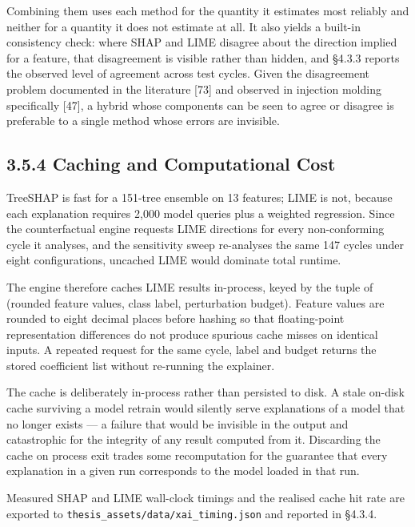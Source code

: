 Combining them uses each method for the quantity it estimates most reliably and neither for a quantity it does not estimate at all. It also yields a built-in consistency check: where SHAP and LIME disagree about the direction implied for a feature, that disagreement is visible rather than hidden, and §4.3.3 reports the observed level of agreement across test cycles. Given the disagreement problem documented in the literature {[}73{]} and observed in injection molding specifically {[}47{]}, a hybrid whose components can be seen to agree or disagree is preferable to a single method whose errors are invisible.

\hypertarget{caching-and-computational-cost}{%
\subsection{3.5.4 Caching and Computational Cost}\label{caching-and-computational-cost}}

TreeSHAP is fast for a 151-tree ensemble on 13 features; LIME is not, because each explanation requires 2,000 model queries plus a weighted regression. Since the counterfactual engine requests LIME directions for every non-conforming cycle it analyses, and the sensitivity sweep re-analyses the same 147 cycles under eight configurations, uncached LIME would dominate total runtime.

The engine therefore caches LIME results in-process, keyed by the tuple of (rounded feature values, class label, perturbation budget). Feature values are rounded to eight decimal places before hashing so that floating-point representation differences do not produce spurious cache misses on identical inputs. A repeated request for the same cycle, label and budget returns the stored coefficient list without re-running the explainer.

The cache is deliberately in-process rather than persisted to disk. A stale on-disk cache surviving a model retrain would silently serve explanations of a model that no longer exists --- a failure that would be invisible in the output and catastrophic for the integrity of any result computed from it. Discarding the cache on process exit trades some recomputation for the guarantee that every explanation in a given run corresponds to the model loaded in that run.

Measured SHAP and LIME wall-clock timings and the realised cache hit rate are exported to \texttt{thesis\_assets/data/xai\_timing.json} and reported in §4.3.4.

